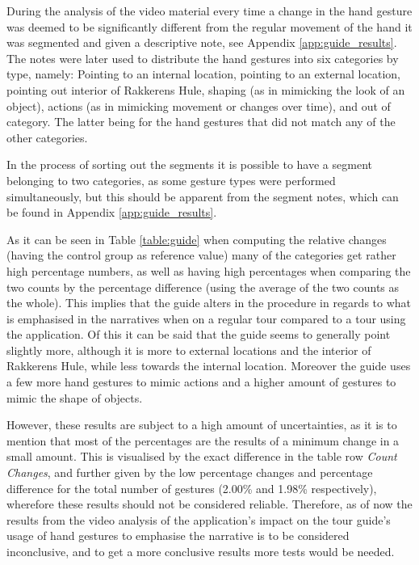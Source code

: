 During the analysis of the video material every time a change in the hand gesture was deemed to be significantly different from the regular movement of the hand it was segmented and given a descriptive note, see Appendix \ref{app:guide_results}. The notes were later used to distribute the hand gestures into six categories by type, namely: Pointing to an internal location, pointing to an external location, pointing out interior of Rakkerens Hule, shaping (as in mimicking the look of an object), actions (as in mimicking movement or changes over time), and out of category. The latter being for the hand gestures that did not match any of the other categories.

In the process of sorting out the segments it is possible to have a segment belonging to two categories, as some gesture types were performed simultaneously, but this should be apparent from the segment notes, which can be found in Appendix \ref{app:guide_results}.

As it can be seen in Table \ref{table:guide} when computing the relative changes (having the control group as reference value) many of the categories get rather high percentage numbers, as well as having high percentages when comparing the two counts by the percentage difference (using the average of the two counts as the whole). This implies that the guide alters in the procedure in regards to what is emphasised in the narratives when on a regular tour compared to a tour using the application. Of this it can be said that the guide seems to generally point slightly more, although it is more to external locations and the interior of Rakkerens Hule, while less towards the internal location. Moreover the guide uses a few more hand gestures to mimic actions and a higher amount of gestures to mimic the shape of objects.

However, these results are subject to a high amount of uncertainties, as it is to mention that most of the percentages are the results of a minimum change in a small amount. This is visualised by the exact difference in the table row \textit{Count Changes}, and further given by the low percentage changes and percentage difference for the total number of gestures (2.00\% and 1.98\% respectively), wherefore these results should not be considered reliable. Therefore, as of now the results from the video analysis of the application’s impact on the tour guide’s usage of hand gestures to emphasise the narrative is to be considered inconclusive, and to get a more conclusive results more tests would be needed.

